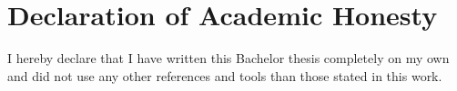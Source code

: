 \section*{Declaration of Academic Honesty}

I hereby declare that I have written this Bachelor thesis completely on my own and did not use any other references and tools than those stated in this work.
\vspace*{3cm}
\par\noindent\makebox[2.5in]{\hrulefill} \hfill\makebox[2.0in]{\hrulefill}%
\par\noindent{}      \hfill{}%
